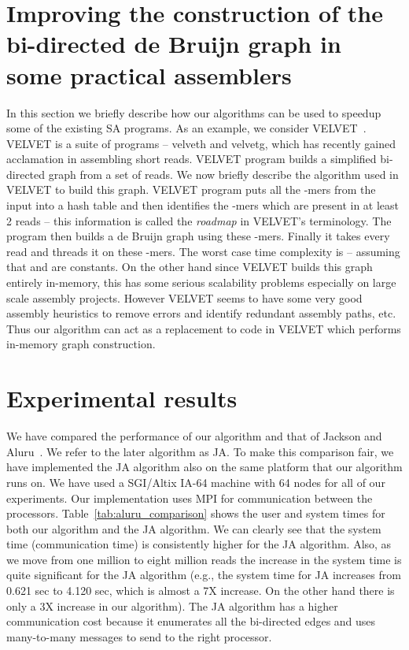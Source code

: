 \documentclass[11pt,conference,twocolumn]{IEEEtran}
\begin{document}
\section{Improving the construction of the bi-directed de Bruijn graph in some 
practical assemblers}
\label{sec:velvet}
In this section we briefly describe how our algorithms can be used to speedup some of the
existing SA programs. As an example, we consider {VELVET}~\cite{velvet08}. VELVET is a suite of 
programs -- {\sf velveth} and {\sf velvetg}, which has recently gained acclamation in assembling 
short reads. VELVET program builds a simplified bi-directed graph from a set of reads. We now
briefly describe the algorithm used in VELVET to build this graph. VELVET program puts all the 
-mers from the input into a hash table and then identifies the -mers which are present 
in at least 2 reads -- this information is called the {\em roadmap} in VELVET's terminology.  
The program then builds a de Bruijn graph using these -mers. Finally it takes every read 
and threads it on these -mers. The worst case time complexity is  -- assuming 
that  and  are constants. On the other hand since VELVET
builds this graph entirely in-memory, this has some serious scalability problems especially on 
large scale assembly projects. However VELVET seems to have some very good assembly 
heuristics to remove errors and identify redundant assembly paths, etc. Thus our algorithm can 
act as a replacement to code in VELVET which performs in-memory graph construction. 



\section{Experimental results}
\label{sec:exp_results}
We have compared the performance of our algorithm and that of Jackson and Aluru~\cite{par_bidirected_graph}.
We refer to the later algorithm as JA.
To make this comparison fair, we have implemented the JA algorithm also on the same platform that
our algorithm runs on.
We have used a SGI/Altix IA-64 machine with 64 nodes for all of our experiments. 
Our implementation uses MPI for communication between the processors. Table~\ref{tab:aluru_comparison} 
shows the user and system times for both our algorithm and the JA algorithm. We can clearly see 
that the system time (communication time) is consistently higher for the JA algorithm. Also, as we move from 
one million to eight million reads the increase in the system time is quite significant for the JA
algorithm (e.g., the system time for JA increases from 0.621 sec to 4.120 sec, which
is almost a 7X increase. On the other hand there is only a 3X increase in our algorithm). The JA
algorithm has a higher communication cost because it enumerates all the bi-directed edges and uses 
many-to-many messages to send to the right processor. 
\end{document}
